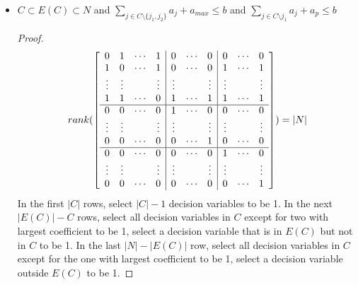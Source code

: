 \begin{itemize}
                        \item $C \subset E(C) \subset N$ and $\sum_{j\in C \setminus \{j_1, j_2\}} a_j + a_{max} \le b$ and $\sum_{j\in C \setminus j_1} a_j + a_p \le b$
                            \begin{proof}
                                \begin{equation*}
                                    rank(\left[\begin{array}{c c c c | c c c | c c c}
                                        0 & 1 & \cdots & 1 & 0 & \cdots & 0 & 0 & \cdots & 0 \\
                                        1 & 0 & \cdots & 1 & 0 & \cdots & 0 & 1 & \cdots & 1 \\
                                        \vdots & \vdots & & \vdots & \vdots & & \vdots & \vdots & & \vdots \\
                                        1 & 1 & \cdots & 0 & 1 & \cdots & 1 & 1 & \cdots & 1\\
                                        \hline
                                        0 & 0 & \cdots & 0 & 1 & \cdots & 0 & 0 & \cdots & 0\\
                                        \vdots & \vdots & & \vdots & \vdots & & \vdots & \vdots & & \vdots \\
                                        0 & 0 & \cdots & 0 & 0 & \cdots & 1 & 0 & \cdots & 0 \\
                                        \hline
                                        0 & 0 & \cdots & 0 & 0 & \cdots & 0 & 1 & \cdots & 0 \\
                                        \vdots & \vdots & & \vdots & \vdots & & \vdots & \vdots & & \vdots \\
                                        0 & 0 & \cdots & 0 & 0 & \cdots & 0 & 0 & \cdots & 1 \\
                                        \end{array}\right]) = |N|
                                \end{equation*}
                                In the first $|C|$ rows, select $|C| - 1$ decision variables to be 1. In the next $|E(C)| - C$ rows, select all decision variables in $C$ except for two with largest coefficient to be 1, select a decision variable that is in $E(C)$ but not in $C$ to be 1. In the last $|N| - |E(C)|$ row, select all decision variables in $C$ except for the one with largest coefficient to be 1, select a decision variable outside $E(C)$ to be 1.
                            \end{proof}
                    \end{itemize}

